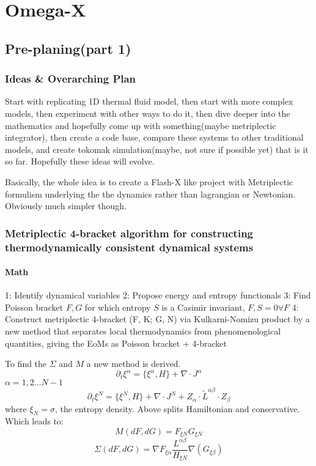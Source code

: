\chapter{Omega-X}
\section{Pre-planing(part 1)}
\subsection{Ideas \& Overarching Plan}
\par Start with replicating 1D thermal fluid model, then start with more complex models, then experiment with other ways to do it, then dive deeper into the mathematics and hopefully come up with something(maybe metriplectic integrator), then create a code base, compare these systems to other traditional models, and create tokomak simulation(maybe, not sure if possible yet) that is it so far. Hopefully these ideas will evolve. 

Basically, the whole idea is to create a Flash-X like project with Metriplectic formulism underlying the the dynamics rather than lagrangian or Newtonian. Obviously much simpler though.

\subsection{Metriplectic 4-bracket algorithm for constructing thermodynamically consistent
 dynamical systems}
\subsubsection{Math}
1: Identify dynamical variables
2: Propose energy and entropy functionals
3: Find Poisson bracket ${F, G}$ for which entropy $S$ is a Casimir invariant, ${F, S} = 0 \forall F$
4: Construct metriplectic 4-bracket (F, K; G, N) via Kulkarni-Nomizu product by a new method that separates local thermodynamics from phenomenological quantities, giving the EoMs as Poisson bracket + 4-bracket

To find the $\Sigma$ and $M$ a new method is derived. 
$$\partial_t \xi^\alpha= \{\xi^\alpha , H\} + \nabla \cdot J^\alpha$$
$\alpha = 1, 2... N-1$
$$\partial_t \xi^N= \{\xi^N , H\} + \nabla \cdot J^N+Z_\alpha \cdot \tilde{L}^{\alpha \beta} \cdot Z_\beta$$
where $\xi_N = \sigma$, the entropy density. Above splits Hamiltonian and conservative.
Which leads to:
$$M(dF, dG)=F_{\xi N}G_{\xi N}$$
$$\Sigma(dF, dG)=\nabla F_{\xi \alpha }\frac{L^{\alpha \beta}}{H_{\xi N}}\nabla (G_{\xi \beta})$$
